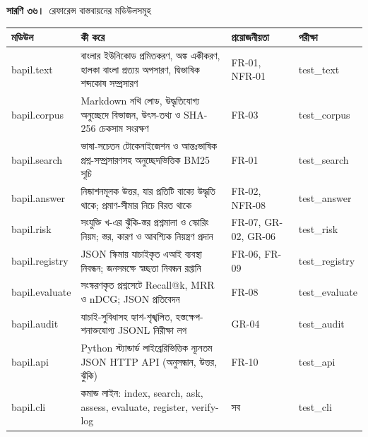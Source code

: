 \documentclass[border=10pt]{standalone}
\begin{document}
\begin{minipage}{17cm}
{\large\bfseries সারণি ৩৬।}\ {\large রেফারেন্স বাস্তবায়নের মডিউলসমূহ}\par\vspace{7pt}
\small
{}
\begin{tabularx}{\linewidth}{@{}>{\hsize=0.819\hsize\raggedright\arraybackslash}X>{\hsize=1.735\hsize\raggedright\arraybackslash}X>{\hsize=0.771\hsize\raggedright\arraybackslash}X>{\hsize=0.675\hsize\raggedright\arraybackslash}X@{}}
\arrayrulecolor{bapilrule}\toprule
\rowcolor{white}\textbf{মডিউল} & \textbf{কী করে} & \textbf{প্রয়োজনীয়তা} & \textbf{পরীক্ষা} \\
\midrule
bapil.text & বাংলার ইউনিকোড প্রমিতকরণ, অঙ্ক একীকরণ, হালকা বাংলা প্রত্যয় অপসারণ, দ্বিভাষিক শব্দকোষ সম্প্রসারণ & FR-01, NFR-01 & test\_text \\
bapil.corpus & Markdown নথি লোড, উদ্ধৃতিযোগ্য অনুচ্ছেদে বিভাজন, উৎস-তথ্য ও SHA-256 চেকসাম সংরক্ষণ & FR-03 & test\_corpus \\
bapil.search & ভাষা-সচেতন টোকেনাইজেশন ও আন্তঃভাষিক প্রশ্ন-সম্প্রসারণসহ অনুচ্ছেদভিত্তিক BM25 সূচি & FR-01 & test\_search \\
bapil.answer & নিষ্কাশনমূলক উত্তর, যার প্রতিটি বাক্যে উদ্ধৃতি থাকে; প্রমাণ-সীমার নিচে বিরত থাকে & FR-02, NFR-08 & test\_answer \\
bapil.risk & সংযুক্তি খ-এর ঝুঁকি-স্তর প্রশ্নমালা ও স্কোরিং নিয়ম; স্তর, কারণ ও আবশ্যিক নিয়ন্ত্রণ প্রদান & FR-07, GR-02, GR-06 & test\_risk \\
bapil.registry & JSON স্কিমায় যাচাইকৃত এআই ব্যবস্থা নিবন্ধন; জনসমক্ষে স্বচ্ছতা নিবন্ধন রপ্তানি & FR-06, FR-09 & test\_registry \\
bapil.evaluate & সংস্করণকৃত প্রশ্নসেটে Recall@k, MRR ও nDCG; JSON প্রতিবেদন & FR-08 & test\_evaluate \\
bapil.audit & যাচাই-সুবিধাসহ হ্যাশ-শৃঙ্খলিত, হস্তক্ষেপ-শনাক্তযোগ্য JSONL নিরীক্ষা লগ & GR-04 & test\_audit \\
bapil.api & Python স্ট্যান্ডার্ড লাইব্রেরিভিত্তিক ন্যূনতম JSON HTTP API (অনুসন্ধান, উত্তর, ঝুঁকি) & FR-10 & test\_api \\
bapil.cli & কমান্ড লাইন: index, search, ask, assess, evaluate, register, verify-log & সব & test\_cli \\
\bottomrule
\end{tabularx}
\par{}
\end{minipage}
\end{document}
